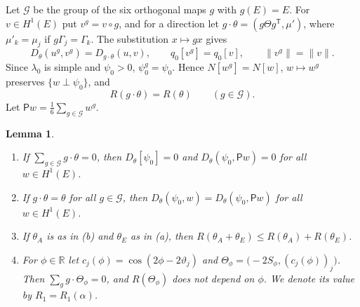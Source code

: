 \documentclass[11pt]{article}
\newtheorem{lemma}[theorem]{Lemma}
\theoremstyle{remark}
\newcommand{\R}{\mathbb{R}}
\begin{document}
Let $\mathcal G$ be the group of the six orthogonal maps $g$ with $g(E)=E$. For $v\in H^1(E)$
put $v^g=v\circ g$, and for a direction let $g\cdot\theta=(g\Theta g^{\mathsf T},\mu')$, where
$\mu'_k=\mu_j$ if $g\Gamma_j=\Gamma_k$. The substitution $x\mapsto gx$ gives
\begin{equation}\label{p-eq:equivar}
  D_\theta(u^g,v^g)=D_{g\cdot\theta}(u,v),\qquad q_0[v^g]=q_0[v],\qquad \|v^g\|=\|v\| .
\end{equation}
Since $\lambda_0$ is simple and $\psi_0>0$, $\psi_0^g=\psi_0$. Hence $N[w^g]=N[w]$,
$w\mapsto w^g$ preserves $\{w\perp\psi_0\}$, and
\begin{equation}\label{p-eq:Rinv}
  R(g\cdot\theta)=R(\theta)\qquad(g\in\mathcal G).
\end{equation}
Let $\mathsf Pw=\frac16\sum_{g\in\mathcal G}w^g$.

\begin{lemma}\label{p-lem:sym}
\begin{enumerate}
\item[\textup{(a)}] If $\sum_{g\in\mathcal G}g\cdot\theta=0$, then $D_\theta[\psi_0]=0$ and
$D_\theta(\psi_0,\mathsf Pw)=0$ for all $w\in H^1(E)$.
\item[\textup{(b)}] If $g\cdot\theta=\theta$ for all $g\in\mathcal G$, then
$D_\theta(\psi_0,w)=D_\theta(\psi_0,\mathsf Pw)$ for all $w\in H^1(E)$.
\item[\textup{(c)}] If $\theta_A$ is as in \textup{(b)} and $\theta_E$ as in \textup{(a)}, then
$R(\theta_A+\theta_E)\le R(\theta_A)+R(\theta_E)$.
\item[\textup{(d)}] For $\phi\in\R$ let $c_j(\phi)=\cos(2\phi-2\vartheta_j)$ and
$\Theta_\phi=\bigl(-2S_\phi,(c_j(\phi))_{j}\bigr)$. Then $\sum_gg\cdot\Theta_\phi=0$, and
$R(\Theta_\phi)$ does not depend on $\phi$. We denote its value by $R_1=R_1(\alpha)$.
\end{enumerate}
\end{lemma}
\end{document}
